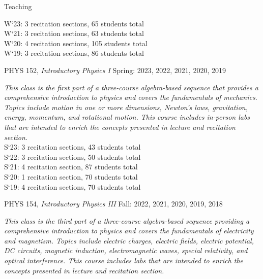 \documentclass{resume} %
\newcommand{\forceindent}{\leavevmode{\parindent=1em\indent}}
\begin{document}
\begin{rSection}{Teaching}
\begin{description}[leftmargin=2em, style=nextline]
\forceindent \forceindent W`23: 3 recitation sections, 65 students total\\
\forceindent \forceindent W`21: 3 recitation sections, 63 students total\\
\forceindent \forceindent W`20: 4 recitation sections, 105 students total\\
\forceindent \forceindent W`19: 3 recitation sections, 86 students total
\end{description}
\vspace{-0.5em}
\forceindent PHYS 152, \textit{Introductory Physics I}  \hfill {Spring: 2023, 2022, 2021, 2020, 2019}
\begin{description}[leftmargin=2em, style=nextline]
\vspace{-0.5em}
\item[~]\textit{This class is the first part of a three-course algebra-based sequence that provides a comprehensive introduction to physics and covers the fundamentals of mechanics. Topics include motion in one or more dimensions, Newton’s laws, gravitation, energy, momentum, and rotational motion. This course includes in-person labs that are intended to enrich the concepts presented in lecture and recitation section.} \\
\forceindent \forceindent S`23: 3 recitation sections, 43 students total\\
\forceindent \forceindent S`22: 3 recitation sections, 50 students total\\
\forceindent \forceindent S`21: 4 recitation section, 87 students total\\
\forceindent \forceindent S`20: 1 recitation section, 70 students total\\
\forceindent \forceindent S`19: 4 recitation sections, 70 students total
\end{description}
\vspace{-0.5em}
\forceindent PHYS 154, \textit{Introductory Physics III}  \hfill {Fall: 2022, 2021, 2020, 2019, 2018}
\begin{description}[leftmargin=2em, style=nextline]
\vspace{-0.5em}
\item[~]\textit{This class is the third part of a three-course algebra-based sequence providing a comprehensive introduction to physics and covers the fundamentals of electricity and magnetism. Topics include electric charges, electric fields, electric potential, DC circuits, magnetic induction, electromagnetic waves, special relativity, and optical interference. This course includes labs that are intended to enrich the concepts presented in lecture and recitation section.} \\

\end{description}
\end{rSection}
\end{document}
